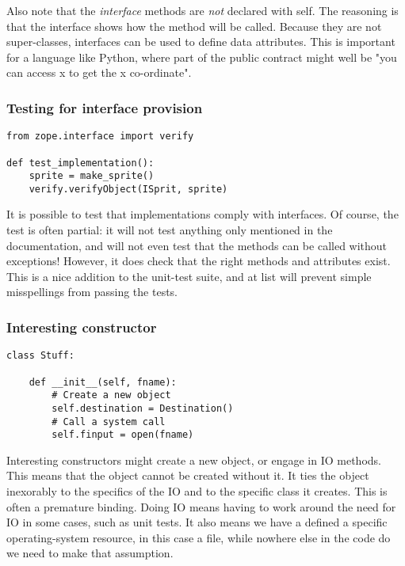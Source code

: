 Also note that the {\em interface} methods
are {\em not} declared with self.
The reasoning is that the interface shows how the method
will be called.
Because they are not super-classes,
interfaces can be used to define data attributes.
This is important for a language like Python,
where part of the public contract might well be
"you can access x to get the x co-ordinate".

\begin{frame}[fragile]
\frametitle{Testing for interface provision}

\begin{lstlisting}
from zope.interface import verify

def test_implementation():
    sprite = make_sprite()
    verify.verifyObject(ISprit, sprite)
\end{lstlisting}

\end{frame}

It is possible to test that implementations comply with interfaces.
Of course,
the test is often partial:
it will not test anything only mentioned in the documentation,
and will not even test that the methods can be called without exceptions!
However,
it does check that the right methods and attributes exist.
This is a nice addition to the unit-test suite,
and at list will prevent simple misspellings from passing the tests.

\begin{frame}[fragile]
\frametitle{Interesting constructor}

\begin{lstlisting}
class Stuff:

    def __init__(self, fname):
        # Create a new object
        self.destination = Destination()
        # Call a system call
        self.finput = open(fname)
\end{lstlisting}

\end{frame}

Interesting constructors might create a new object,
or engage in IO methods.
This means that the object cannot be created without it.
It ties the object inexorably to the specifics of the IO
and to the specific class it creates.
This is often a premature binding.
Doing IO means having to work around the need for IO
in some cases,
such as unit tests.
It also means we have a defined a specific operating-system resource,
in this case a file,
while nowhere else in the code do we need to make that assumption.

